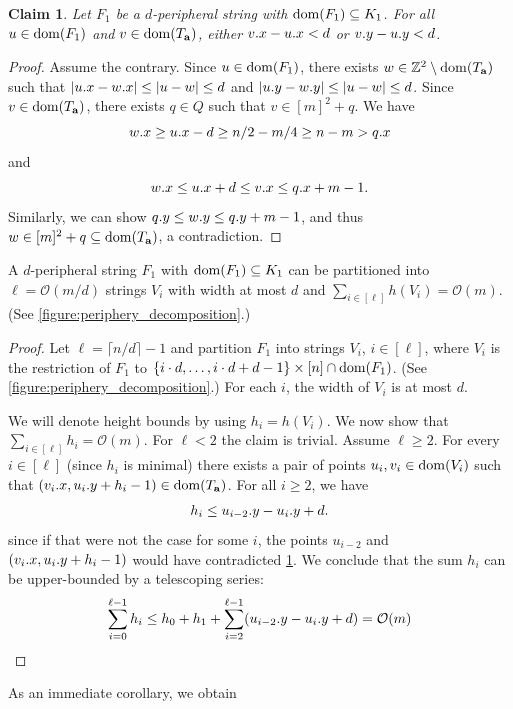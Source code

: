 \documentclass[twoside,leqno]{article}
\newtheorem{claim}{Claim}[section]
\newcommand{\Z}{\mathbb{Z}}
\renewcommand{\O}{\mathcal{O}}
\newcommand{\set}[1]{\left\lbrace #1 \right\rbrace}
\newcommand{\absolute}[1]{\left\lvert#1\right\rvert}
\begin{document}
\begin{claim}\label{border_lemma}
Let $F_1$ be a $d$-peripheral string with $\operatorname*{dom}(F_1) \subseteq K_1$. For all $u \in \operatorname*{dom}(F_1)$ and ${v \in \operatorname*{dom}(T_\mathbf{a})}$, either $v.x - u.x < d$ or $v.y - u.y < d$.  
\end{claim}
\begin{proof}
Assume the contrary. Since $u \in \operatorname*{dom}(F_1)$, there exists $w \in \Z^2 \setminus \d{\Ta}$ such that $\absolute{\x{u} - \x{w}} \le \absolute{u-w} \le d$ and $\absolute{\y{u} - \y{w}} \le \absolute{u-w} \le d$. Since $v \in \operatorname*{dom}(T_\mathbf{a})$, there exists $q \in Q$ such that $v \in [m]^2 + q$. We have
\[ w.x \ge u.x - d \ge n/2 - m/4 \ge n - m > q.x\]
and
\[ w.x \le u.x + d \le v.x \le q.x + m - 1. \]
Similarly, we can show $q.y \le w.y \le q.y + m - 1$, and thus $w \in [m]^2 + q \subseteq \operatorname*{dom}(T_\mathbf{a})$, a contradiction.
\end{proof}

\begin{lemma}\label{lm:partitioning}
A $d$-peripheral string $F_1$ with $\operatorname*{dom}(F_1) \subseteq K_1$ can be partitioned into $\ell = \O(m/d)$ strings $V_i$ with width at most $d$ and $\sum_{i \in [\ell]} h(V_i) = \O(m)$. (See \cref{figure:periphery_decomposition}.)
\end{lemma}
\begin{proof}
Let $\ell = \lceil n / d \rceil - 1$ and partition $F_1$ into strings $V_i$, $i \in [\ell]$, where $V_i$ is the restriction of $F_1$ to $\set{i \cdot d, \dots, i \cdot d + d - 1} \times [n] \cap \d{F_1}$. (See \cref{figure:periphery_decomposition}.) 
For each $i$, the width of $V_i$ is at most $d$. 

We will denote height bounds by using $h_i = h(V_i)$. We now show that $\sum_{i \in [\ell]} h_i = \O(m)$. For $\ell < 2$ the claim is trivial. Assume $\ell \ge 2$. For every $i \in [\ell]$ (since $h_i$ is minimal) there exists a pair of points $u_i, v_i \in \operatorname*{dom}(V_i)$ such that $(v_i.x, u_i.y + h_i - 1) \in \operatorname*{dom}(T_\mathbf{a})$. For all $i \ge 2$, we have
\[ h_i \le u_{i - 2}.y - u_{i}.y + d.\]
since if that were not the case for some $i$, the points $u_{i - 2}$ and $(v_{i}.x, u_{i}.y + h_i - 1)$ would have contradicted \cref{border_lemma}. We conclude that the sum $h_i$ can be upper-bounded by a telescoping series:
%
$$\sum_{i = 0}^{\ell - 1} h_i \le h_0 + h_1 + \sum_{i = 2}^{\ell - 1} (\y{u_{i - 2}} - \y{u_i} + d) = \O(m)$$
\end{proof}

As an immediate corollary, we obtain
\end{document}
